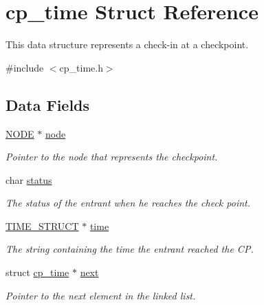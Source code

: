 \hypertarget{structcp__time}{\section{cp\-\_\-time Struct Reference}
\label{structcp__time}
}


This data structure represents a check-\/in at a checkpoint.  




{\ttfamily \#include $<$cp\-\_\-time.\-h$>$}

\subsection*{Data Fields}
{\bf }\par
\begin{DoxyCompactItemize}
\item 
\hypertarget{structcp__time_a127a337a91737225cc5bb39aea460bb8}{\hyperlink{node_8h_a01aae0d1f45b520aec535df5f9d9afb7}{N\-O\-D\-E} $\ast$ \hyperlink{structcp__time_a127a337a91737225cc5bb39aea460bb8}{node}}\label{structcp__time_a127a337a91737225cc5bb39aea460bb8}

\begin{DoxyCompactList}\small\item\em Pointer to the node that represents the checkpoint. \end{DoxyCompactList}\item 
\hypertarget{structcp__time_a5d6c3285ede15ebb5fc7c7f554fc3dbf}{char \hyperlink{structcp__time_a5d6c3285ede15ebb5fc7c7f554fc3dbf}{status}}\label{structcp__time_a5d6c3285ede15ebb5fc7c7f554fc3dbf}

\begin{DoxyCompactList}\small\item\em The status of the entrant when he reaches the check point. \end{DoxyCompactList}\item 
\hypertarget{structcp__time_a78006393cc2913db19f9692a100fe273}{\hyperlink{time__struct_8h_a3bbd7adf563300f0bd980d2ea319881d}{T\-I\-M\-E\-\_\-\-S\-T\-R\-U\-C\-T} $\ast$ \hyperlink{structcp__time_a78006393cc2913db19f9692a100fe273}{time}}\label{structcp__time_a78006393cc2913db19f9692a100fe273}

\begin{DoxyCompactList}\small\item\em The string containing the time the entrant reached the C\-P. \end{DoxyCompactList}\item 
\hypertarget{structcp__time_a0061fc8f98b87bf7d79fc39c1fd67764}{struct \hyperlink{structcp__time}{cp\-\_\-time} $\ast$ \hyperlink{structcp__time_a0061fc8f98b87bf7d79fc39c1fd67764}{next}}\label{structcp__time_a0061fc8f98b87bf7d79fc39c1fd67764}

\begin{DoxyCompactList}\small\item\em Pointer to the next element in the linked list. \end{DoxyCompactList}\end{DoxyCompactItemize}



